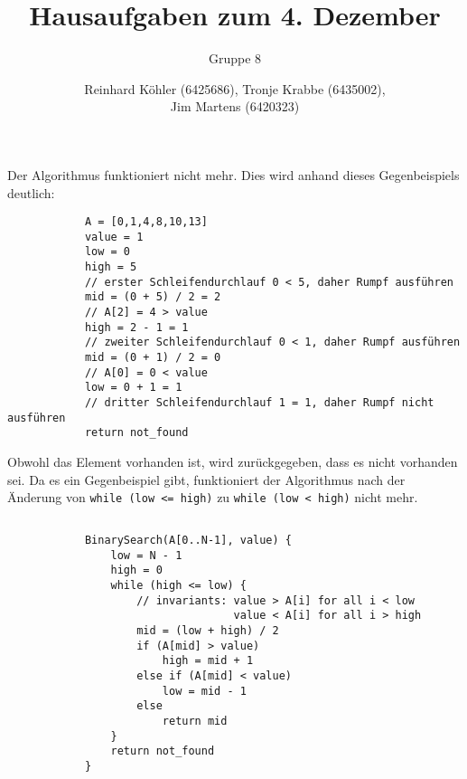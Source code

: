 \documentclass[10pt,a4paper,oneside,ngerman,numbers=noenddot]{scrartcl}
\begin{document}
\author{Reinhard Köhler (6425686), Tronje Krabbe (6435002), \\
Jim Martens (6420323)}
\title{Hausaufgaben zum 4. Dezember}
\subtitle{Gruppe 8}
\maketitle
\section{} %
	\subsection{} %
		Der Algorithmus funktioniert nicht mehr. Dies wird anhand dieses Gegenbeispiels deutlich:
		
		\begin{verbatim}
		    A = [0,1,4,8,10,13]
		    value = 1
		    low = 0
		    high = 5
		    // erster Schleifendurchlauf 0 < 5, daher Rumpf ausführen
		    mid = (0 + 5) / 2 = 2
		    // A[2] = 4 > value
		    high = 2 - 1 = 1
		    // zweiter Schleifendurchlauf 0 < 1, daher Rumpf ausführen
		    mid = (0 + 1) / 2 = 0
		    // A[0] = 0 < value
		    low = 0 + 1 = 1
		    // dritter Schleifendurchlauf 1 = 1, daher Rumpf nicht ausführen
		    return not_found
		\end{verbatim}
		
		Obwohl das Element vorhanden ist, wird zurückgegeben, dass es nicht vorhanden sei. Da es ein Gegenbeispiel gibt, funktioniert der Algorithmus nach der Änderung von \texttt{while (low <= high)} zu \texttt{while (low < high)} nicht mehr.
	\subsection{} %
		\begin{verbatim}
		    BinarySearch(A[0..N-1], value) {
		        low = N - 1
		        high = 0
		        while (high <= low) {
		            // invariants: value > A[i] for all i < low
		                           value < A[i] for all i > high
		            mid = (low + high) / 2
		            if (A[mid] > value)
		                high = mid + 1
		            else if (A[mid] < value)
		                low = mid - 1
		            else
		                return mid
		        }
		        return not_found
		    }
		\end{verbatim}
\end{document}
